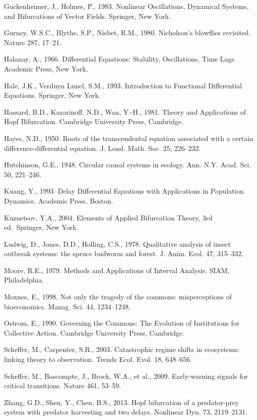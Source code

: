 \documentclass[11pt]{article}
\begin{document}
Guckenheimer, J., Holmes, P., 1983. Nonlinear Oscillations, Dynamical
Systems, and Bifurcations of Vector Fields. Springer, New York.

Gurney, W.S.C., Blythe, S.P., Nisbet, R.M., 1980. Nicholson's blowflies
revisited. Nature 287, 17--21.

Halanay, A., 1966. Differential Equations: Stability, Oscillations, Time
Lags. Academic Press, New York.

Hale, J.K., Verduyn Lunel, S.M., 1993. Introduction to Functional
Differential Equations. Springer, New York.

Hassard, B.D., Kazarinoff, N.D., Wan, Y.-H., 1981. Theory and
Applications of Hopf Bifurcation. Cambridge University Press, Cambridge.

Hayes, N.D., 1950. Roots of the transcendental equation associated with
a certain difference-differential equation. J. Lond. Math. Soc. 25,
226--232.

Hutchinson, G.E., 1948. Circular causal systems in ecology. Ann. N.Y.
Acad. Sci. 50, 221--246.

Kuang, Y., 1993. Delay Differential Equations with Applications in
Population Dynamics. Academic Press, Boston.

Kuznetsov, Y.A., 2004. Elements of Applied Bifurcation Theory, 3rd
ed.~Springer, New York.

Ludwig, D., Jones, D.D., Holling, C.S., 1978. Qualitative analysis of
insect outbreak systems: the spruce budworm and forest. J. Anim. Ecol.
47, 315--332.

Moore, R.E., 1979. Methods and Applications of Interval Analysis. SIAM,
Philadelphia.

Moxnes, E., 1998. Not only the tragedy of the commons: misperceptions of
bioeconomics. Manag. Sci. 44, 1234--1248.

Ostrom, E., 1990. Governing the Commons: The Evolution of Institutions
for Collective Action. Cambridge University Press, Cambridge.

Scheffer, M., Carpenter, S.R., 2003. Catastrophic regime shifts in
ecosystems: linking theory to observation. Trends Ecol. Evol. 18,
648--656.

Scheffer, M., Bascompte, J., Brock, W.A., et al., 2009. Early-warning
signals for critical transitions. Nature 461, 53--59.

Zhang, G.D., Shen, Y., Chen, B.S., 2013. Hopf bifurcation of a
predator-prey system with predator harvesting and two delays. Nonlinear
Dyn. 73, 2119--2131.
\end{document}
